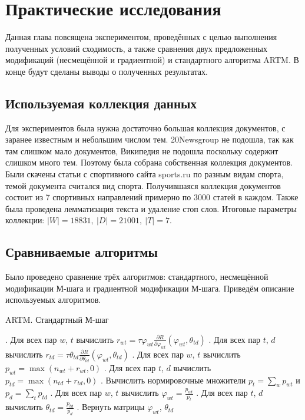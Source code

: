 \documentclass[12pt]{article}
\newenvironment{rusalgorithm}[1][htb]
  {\renewcommand{\algorithmcfname}{Алгоритм}
   \begin{algorithm}[#1]
  }{\end{algorithm}}
\renewcommand{\phi}{\varphi}
\begin{document}
	\section{Практические исследования}
Данная глава повсящена экспериментом, проведённых с целью выполнения полученных условий сходимость, а также сравнения двух предложенных модификаций (несмещённой и градиентной) и стандартного алгоритма ARTM. В конце будут сделаны выводы о полученных результатах.
\subsection{Используемая коллекция данных}
Для экспериментов была нужна достаточно большая коллекция документов, с заранее известным  и небольшим числом тем. 20Newsgroup не подошла, так как там слишком мало документов, Википедия не подошла поскольку содержит слишком много тем. Поэтому была собрана собственная коллекция документов. Были скачены статьи с спортивного сайта sports.ru по разным видам спорта, темой документа считался вид спорта. Получившаяся коллекция документов состоит из 7 спортивных направлений примерно по 3000 статей в каждом. Также была проведена лемматизация текста и удаление стоп слов. Итоговые параметры коллекции: $|W| = 18831,~|D| = 21001,~|T| = 7$.
	\subsection{Сравниваемые алгоритмы}
Было проведено сравнение трёх алгоритмов: стандартного, несмещённой модификации М-шага и градиентной модификации М-шага. Приведём описание используемых алгоритмов.
\begin{rusalgorithm}[H]
\caption{ARTM. Стандартный М-шаг}\label{malgo1}
\begin{algorithmic}[]
\Procedure{MStep}{$n_{wt}$, $n_{td}$, $\phi_{wt}$, $\theta_{td}$}
. Для всех пар $w$, $t$ вычислить $r_{wt} = \tau \phi_{wt} \frac{\partial{R}}{\partial{\phi_{wt}}}(\phi_{wt}, \theta_{td})$
. Для всех пар $t$, $d$ вычислить $r_{td} =\tau  \theta_{td} \frac{\partial{R}}{\partial{\theta_{td}}}(\phi_{wt}, \theta_{td})$
. Для всех пар $w$, $t$ вычислить $p_{wt} = \max(n_{wt} + r_{wt}, 0)$
. Для всех пар $t$, $d$ вычислить $p_{td} = \max(n_{td} + r_{td}, 0)$
. Вычислить нормировочные множители $p_t = \sum_w p_{wt}$ и $p_d = \sum_t p_{td}$
. Для всех пар $w$, $t$ вычислить $\phi_{wt} = \frac{p_{wt}}{p_t}$
. Для всех пар $t$, $d$ вычислить $\theta_{td} = \frac{p_{td}}{p_d}$
. Вернуть матрицы $\phi_{wt}$, $\theta_{td}$
\EndProcedure
\end{algorithmic}
\end{rusalgorithm}
\end{document}
